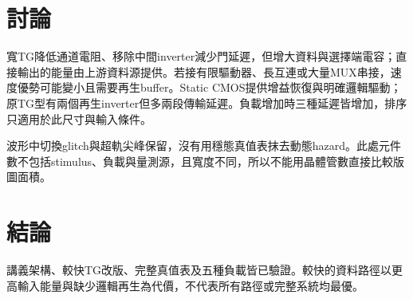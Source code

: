 \section{討論}
寬TG降低通道電阻、移除中間inverter減少門延遲，但增大資料與選擇端電容；直接輸出的能量由上游資料源提供。若接有限驅動器、長互連或大量MUX串接，速度優勢可能變小且需要再生buffer。Static CMOS提供增益恢復與明確邏輯驅動；原TG型有兩個再生inverter但多兩段傳輸延遲。負載增加時三種延遲皆增加，排序只適用於此尺寸與輸入條件。

波形中切換glitch與超軌尖峰保留，沒有用穩態真值表抹去動態hazard。此處元件數不包括stimulus、負載與量測源，且寬度不同，所以不能用晶體管數直接比較版圖面積。

\section{結論}
講義架構、較快TG改版、完整真值表及五種負載皆已驗證。較快的資料路徑以更高輸入能量與缺少邏輯再生為代價，不代表所有路徑或完整系統均最優。
